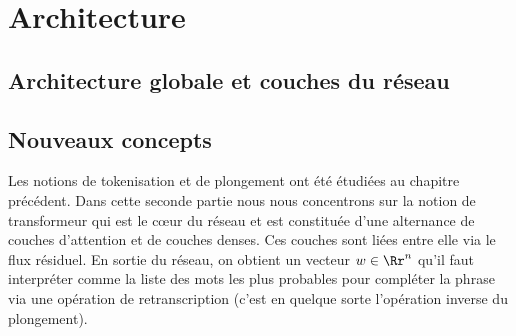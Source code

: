 \documentclass[11pt,class=report,crop=false]{standalone}
\begin{document}







\section{Architecture}
\vspace{-2ex}
\subsection{Architecture globale et couches du réseau}


\begin{center}
	\begin{minipage}{0.49\textwidth}
		\small	
	\end{minipage}
	\begin{minipage}{0.49\textwidth}
		
	\end{minipage}
\end{center}

\subsection{Nouveaux concepts}

Les notions de tokenisation et de plongement ont été étudiées au chapitre précédent. Dans cette seconde partie nous nous concentrons sur la notion de transformeur qui est le c\oe ur du réseau et est constituée d'une alternance de couches d'attention et de couches denses. Ces couches sont liées entre elle via le flux résiduel. En sortie du réseau, on obtient un vecteur $w\in \Rr^n$ qu'il faut interpréter comme la liste des mots les plus probables pour compléter la phrase via une opération de retranscription (c'est en quelque sorte l'opération inverse du plongement).
\end{document}
